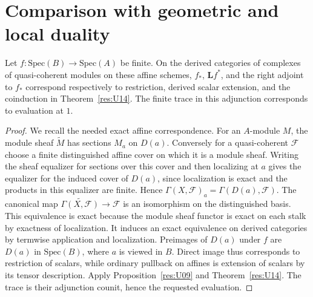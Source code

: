 \section{Comparison with geometric and local duality}

\begin{proposition}\label{res:U18}
Let \(f:\mathrm{Spec}(B)\to\mathrm{Spec}(A)\) be finite.
On the derived categories of complexes of quasi-coherent
modules on these affine schemes, \(f_*\), \(\mathbf Lf^*\),
and the right adjoint to \(f_*\) correspond respectively to
restriction, derived scalar extension, and the coinduction
in Theorem~\ref{res:U14}. The finite trace in this adjunction
corresponds to evaluation at \(1\).
\end{proposition}
\begin{proof}
We recall the needed exact affine correspondence.
For an \(A\)-module \(M\), the module sheaf \(\widetilde M\)
has sections \(M_a\) on \(D(a)\).
Conversely for a quasi-coherent \(\mathcal F\) choose a finite
distinguished affine cover on which it is a module sheaf.
Writing the sheaf equalizer for sections over this cover
and then localizing at \(a\) gives the equalizer for the
induced cover of \(D(a)\), since localization is exact
and the products in this equalizer are finite. Hence
\(\Gamma(X,\mathcal F)_a=\Gamma(D(a),\mathcal F)\).
The canonical map \(\widetilde{\Gamma(X,\mathcal F)}\to
\mathcal F\) is an isomorphism on the distinguished basis.
This equivalence is exact because the module sheaf functor
is exact on each stalk by exactness of localization. It
induces an exact equivalence on derived categories by
termwise application and localization. Preimages of \(D(a)\)
under \(f\) are \(D(a)\) in \(\mathrm{Spec}(B)\), where \(a\)
is viewed in \(B\). Direct image thus corresponds to
restriction of scalars, while ordinary pullback on affines
is extension of scalars by its tensor description.
Apply Proposition~\ref{res:U09} and
Theorem~\ref{res:U14}. The trace is their adjunction counit,
hence the requested evaluation.
\end{proof}

